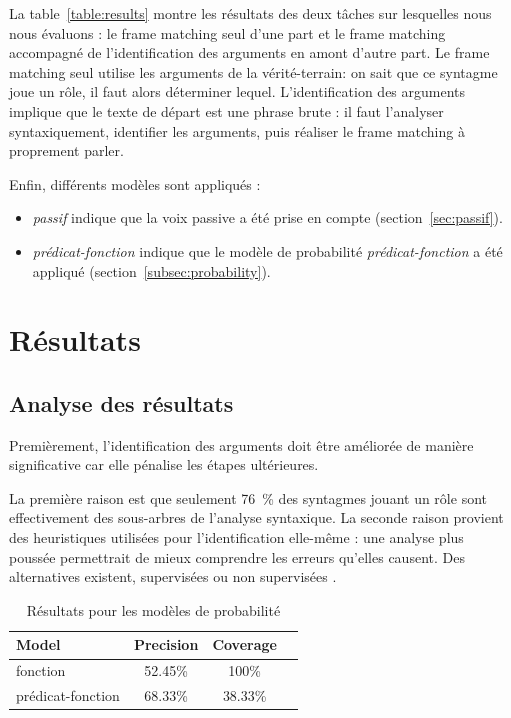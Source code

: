 La table~\ref{table:results} montre les résultats des deux tâches sur
lesquelles nous nous évaluons : le frame matching seul d'une part et le frame
matching accompagné de l'identification des arguments en amont d'autre part. Le
frame matching seul utilise les arguments de la vérité-terrain: on sait que ce
syntagme joue un rôle, il faut alors déterminer lequel. L'identification des
arguments implique que le texte de départ est une phrase brute : il faut
l'analyser syntaxiquement, identifier les arguments, puis réaliser le frame
matching à proprement parler.

Enfin, différents modèles sont appliqués :

\begin{itemize}

    \item \emph{passif} indique que la voix passive a été prise en compte
    (section~\ref{sec:passif}).

    \item \emph{prédicat-fonction} indique que le modèle de probabilité
    \emph{prédicat-fonction} a été appliqué (section~\ref{subsec:probability}).

\end{itemize}

\section{Résultats}

\subsection{Analyse des résultats}

Premièrement, l'identification des arguments doit être améliorée de manière
significative car elle pénalise les étapes ultérieures.

La première raison est que seulement 76~\% des syntagmes jouant un rôle sont
effectivement des sous-arbres de l'analyse syntaxique.
La seconde raison provient des heuristiques utilisées pour l'identification
elle-même : une analyse plus poussée permettrait de mieux comprendre les
erreurs qu'elles causent. Des alternatives existent, supervisées ou non
supervisées \citep{abend2009unsupervised}.

\begin{table}[ht]
    \centering
    \begin{tabular}{lccc}
        \toprule
        Model          & Precision & Coverage \\
        \midrule
        fonction           & 52.45\% & 100\% \\
        prédicat-fonction & 68.33\% & 38.33\% \\
        \bottomrule
    \end{tabular}
    \caption{\protect\centering\label{table:probabilisticresults}Résultats pour les modèles de probabilité}
\end{table}


